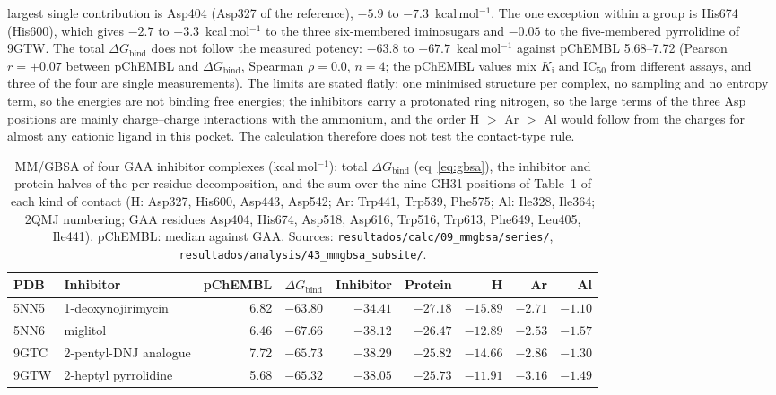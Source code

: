 \documentclass[preprint,12pt]{elsarticle}
\begin{document}
largest single contribution is Asp404 (Asp327 of the reference), $-5.9$ to
$-7.3$~kcal\,mol$^{-1}$. The one exception within a group is His674 (His600), which gives
$-2.7$ to $-3.3$~kcal\,mol$^{-1}$ to the three six-membered iminosugars and $-0.05$ to the
five-membered pyrrolidine of 9GTW. The total $\Delta G_\mathrm{bind}$ does not follow the
measured potency: $-63.8$ to $-67.7$~kcal\,mol$^{-1}$ against pChEMBL 5.68--7.72
(Pearson $r = +0.07$ between pChEMBL and $\Delta G_\mathrm{bind}$, Spearman $\rho=0.0$,
$n=4$; the pChEMBL values mix $K_\mathrm{i}$ and IC$_{50}$ from different assays, and three of
the four are single measurements). The limits are stated flatly: one minimised structure
per complex, no sampling and no entropy term, so the energies are not binding free
energies; the inhibitors carry a protonated ring nitrogen, so the large terms of the three
Asp positions are mainly charge--charge interactions with the ammonium, and the order
H $>$ Ar $>$ Al would follow from the charges for almost any cationic ligand in this pocket.
The calculation therefore does not test the contact-type rule.

\begin{table}[h]
\centering\small
\caption{MM/GBSA of four GAA inhibitor complexes (kcal\,mol$^{-1}$): total
$\Delta G_\mathrm{bind}$ (eq~\ref{eq:gbsa}), the inhibitor and protein halves of the
per-residue decomposition, and the sum over the nine GH31 positions of Table~1 of each kind of
contact (H: Asp327, His600, Asp443, Asp542; Ar: Trp441, Trp539, Phe575; Al: Ile328, Ile364;
2QMJ numbering; GAA residues Asp404, His674, Asp518, Asp616, Trp516, Trp613, Phe649,
Leu405, Ile441). pChEMBL: median against GAA. Sources:
\texttt{resultados/calc/09\_mmgbsa/series/}, \texttt{resultados/analysis/43\_mmgbsa\_subsite/}.}
\label{tab:gbsa}
\begin{tabular}{llrrrrrrr}
\toprule
PDB & Inhibitor & pChEMBL & $\Delta G_\mathrm{bind}$ & Inhibitor & Protein & H & Ar & Al\\
\midrule
5NN5 & 1-deoxynojirimycin & 6.82 & $-63.80$ & $-34.41$ & $-27.18$ & $-15.89$ & $-2.71$ & $-1.10$\\
5NN6 & miglitol & 6.46 & $-67.66$ & $-38.12$ & $-26.47$ & $-12.89$ & $-2.53$ & $-1.57$\\
9GTC & 2-pentyl-DNJ analogue & 7.72 & $-65.73$ & $-38.29$ & $-25.82$ & $-14.66$ & $-2.86$ & $-1.30$\\
9GTW & 2-heptyl pyrrolidine & 5.68 & $-65.32$ & $-38.05$ & $-25.73$ & $-11.91$ & $-3.16$ & $-1.49$\\
\bottomrule
\end{tabular}
\end{table}




\end{document}
